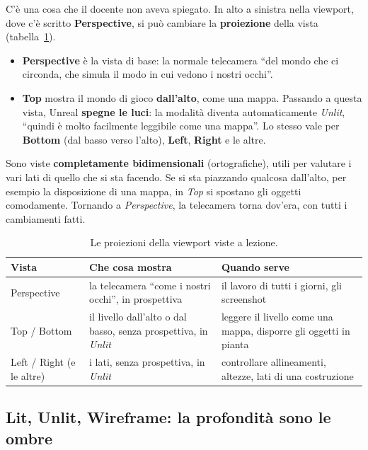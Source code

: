 C'è una cosa che il docente non aveva spiegato. In alto a sinistra nella viewport,
dove c'è scritto \textbf{Perspective}, si può cambiare la \textbf{proiezione} della
vista (tabella~\ref{gd14:tab:viste}).
\begin{itemize}
  \item \textbf{Perspective} è la vista di base: la normale telecamera ``del mondo
        che ci circonda, che simula il modo in cui vedono i nostri occhi''.
  \item \textbf{Top} mostra il mondo di gioco \textbf{dall'alto}, come una mappa.
        Passando a questa vista, Unreal \textbf{spegne le luci}: la modalità
        diventa automaticamente \emph{Unlit}, ``quindi è molto facilmente
        leggibile come una mappa''. Lo stesso vale per \textbf{Bottom} (dal basso
        verso l'alto), \textbf{Left}, \textbf{Right} e le altre.
\end{itemize}
Sono viste \textbf{completamente bidimensionali} (ortografiche), utili per valutare
i vari lati di quello che si sta facendo. Se si sta piazzando qualcosa dall'alto,
per esempio la disposizione di una mappa, in \emph{Top} si spostano gli oggetti
comodamente. Tornando a \emph{Perspective}, la telecamera torna dov'era, con tutti
i cambiamenti fatti.

\begin{table}[htbp]
\centering
\small
\begin{tabular}{@{}p{3.0cm}p{4.6cm}p{5.0cm}@{}}
\toprule
\textbf{Vista} & \textbf{Che cosa mostra} & \textbf{Quando serve} \\
\midrule
Perspective & la telecamera ``come i nostri occhi'', in prospettiva &
  il lavoro di tutti i giorni, gli screenshot \\
\addlinespace
Top / Bottom & il livello dall'alto o dal basso, senza prospettiva, in
  \emph{Unlit} & leggere il livello come una mappa, disporre gli oggetti in
  pianta \\
\addlinespace
Left / Right (e le altre) & i lati, senza prospettiva, in \emph{Unlit} &
  controllare allineamenti, altezze, lati di una costruzione \\
\bottomrule
\end{tabular}
\caption{Le proiezioni della viewport viste a lezione.}
\label{gd14:tab:viste}
\end{table}

\subsection{Lit, Unlit, Wireframe: la profondità sono le ombre}

